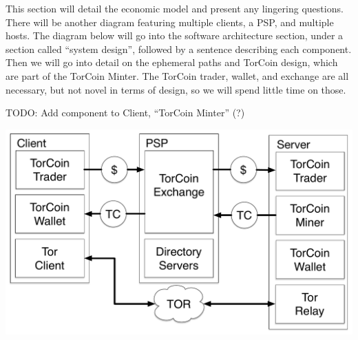 This section will detail the economic model and present any lingering questions. There will be another diagram featuring multiple clients, a PSP, and multiple hosts. The diagram below will go into the software architecture section, under a section called ``system design'', followed by a sentence describing each component. Then we will go into detail on the ephemeral paths and TorCoin design, which are part of the TorCoin Minter. The TorCoin trader, wallet, and exchange are all necessary, but not novel in terms of design, so we will spend little time on those.

TODO: Add component to Client, ``TorCoin Minter'' (?)

\includegraphics[scale=0.5]{figures/overview.pdf}